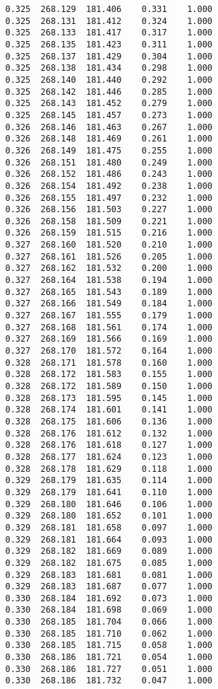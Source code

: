 \begin{verbatim}
   0.325  268.129  181.406    0.331    1.000
   0.325  268.131  181.412    0.324    1.000
   0.325  268.133  181.417    0.317    1.000
   0.325  268.135  181.423    0.311    1.000
   0.325  268.137  181.429    0.304    1.000
   0.325  268.138  181.434    0.298    1.000
   0.325  268.140  181.440    0.292    1.000
   0.325  268.142  181.446    0.285    1.000
   0.325  268.143  181.452    0.279    1.000
   0.325  268.145  181.457    0.273    1.000
   0.326  268.146  181.463    0.267    1.000
   0.326  268.148  181.469    0.261    1.000
   0.326  268.149  181.475    0.255    1.000
   0.326  268.151  181.480    0.249    1.000
   0.326  268.152  181.486    0.243    1.000
   0.326  268.154  181.492    0.238    1.000
   0.326  268.155  181.497    0.232    1.000
   0.326  268.156  181.503    0.227    1.000
   0.326  268.158  181.509    0.221    1.000
   0.326  268.159  181.515    0.216    1.000
   0.327  268.160  181.520    0.210    1.000
   0.327  268.161  181.526    0.205    1.000
   0.327  268.162  181.532    0.200    1.000
   0.327  268.164  181.538    0.194    1.000
   0.327  268.165  181.543    0.189    1.000
   0.327  268.166  181.549    0.184    1.000
   0.327  268.167  181.555    0.179    1.000
   0.327  268.168  181.561    0.174    1.000
   0.327  268.169  181.566    0.169    1.000
   0.327  268.170  181.572    0.164    1.000
   0.328  268.171  181.578    0.160    1.000
   0.328  268.172  181.583    0.155    1.000
   0.328  268.172  181.589    0.150    1.000
   0.328  268.173  181.595    0.145    1.000
   0.328  268.174  181.601    0.141    1.000
   0.328  268.175  181.606    0.136    1.000
   0.328  268.176  181.612    0.132    1.000
   0.328  268.176  181.618    0.127    1.000
   0.328  268.177  181.624    0.123    1.000
   0.328  268.178  181.629    0.118    1.000
   0.329  268.179  181.635    0.114    1.000
   0.329  268.179  181.641    0.110    1.000
   0.329  268.180  181.646    0.106    1.000
   0.329  268.180  181.652    0.101    1.000
   0.329  268.181  181.658    0.097    1.000
   0.329  268.181  181.664    0.093    1.000
   0.329  268.182  181.669    0.089    1.000
   0.329  268.182  181.675    0.085    1.000
   0.329  268.183  181.681    0.081    1.000
   0.329  268.183  181.687    0.077    1.000
   0.330  268.184  181.692    0.073    1.000
   0.330  268.184  181.698    0.069    1.000
   0.330  268.185  181.704    0.066    1.000
   0.330  268.185  181.710    0.062    1.000
   0.330  268.185  181.715    0.058    1.000
   0.330  268.186  181.721    0.054    1.000
   0.330  268.186  181.727    0.051    1.000
   0.330  268.186  181.732    0.047    1.000

\end{verbatim}
